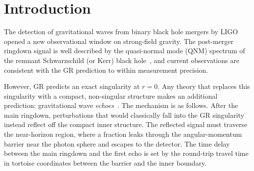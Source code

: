\documentclass[12pt]{article}
\newcommand{\lP}{l_P}
\newcommand{\rS}{r_S}
\newcommand{\rcore}{r_{\mathrm{core}}}
\newcommand{\Dt}{\Delta t_{\mathrm{echo}}}
\begin{document}
\begin{abstract}
The CPP strong-field companion (companion~8) established that the CP
Exclusion Rule replaces the GR point singularity with a Planck-density
core at radius $\rcore = \rS/2$ inside the event horizon.  We show that
this core acts as a partially reflective boundary for gravitational
perturbations, producing post-merger gravitational wave echoes with a
characteristic time delay:
\begin{equation}
  \Dt \;=\; \frac{2\rS}{c}\!\left[\ln\!\left(\frac{\rS}{\lP}\right)
  - 0.193 + O\!\left(\frac{\lP}{\rS}\right)\right]
  \;\approx\; \frac{2\rS}{c}\ln\!\left(\frac{\rS}{\lP}\right),
  \label{eq:delay_abstract}
\end{equation}
derived from the tortoise-coordinate travel time between the photon-sphere
potential barrier ($r \approx 3\rS/2$) and the effective reflective surface
at $r_0 = \rS + \lP$ (quantum Planck boundary just outside the horizon).
The correction term $-0.193$ is negligible compared to
$\ln(\rS/\lP) \approx 88$--$93$ for all astrophysical black holes.

For the GW150914 remnant ($M \approx 62\,M_\odot$), the predicted echo
delay is $\Dt \approx 112$~ms, with a signal frequency $f_{\mathrm{echo}}
\approx 8.9$~Hz at the boundary of LIGO O4 sensitivity and within the
design band of the Einstein Telescope.  A table of predictions spanning
stellar-mass to intermediate-mass black holes is provided.  No new
postulates beyond companion~8 are required.
\end{abstract}

\section{Introduction}
\label{sec:intro}

The detection of gravitational waves from binary black hole mergers by
LIGO~\cite{ligo2016} opened a new observational window on strong-field
gravity.  The post-merger ringdown signal is well described by the
quasi-normal mode (QNM) spectrum of the remnant Schwarzschild (or Kerr)
black hole~\cite{berti2009}, and current observations are consistent with
the GR prediction to within measurement precision.

However, GR predicts an exact singularity at $r = 0$.  Any theory that
replaces this singularity with a compact, non-singular structure makes an
additional prediction: gravitational wave \emph{echoes}~\cite{cardoso2016}.
The mechanism is as follows.  After the main ringdown, perturbations that
would classically fall into the GR singularity instead reflect off the
compact inner structure.  The reflected signal must traverse the near-horizon
region, where a fraction leaks through the angular-momentum barrier near the
photon sphere and escapes to the detector.  The time delay between the main
ringdown and the first echo is set by the round-trip travel time in tortoise
coordinates between the barrier and the inner boundary.
\end{document}
